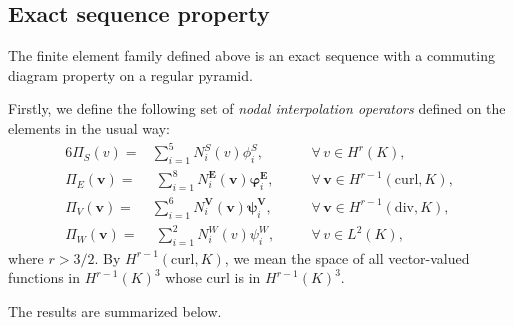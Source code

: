 \documentclass[twoside,reqno,final]{amsart}
\renewcommand{\b}[1]{{\boldsymbol{#1}}}
\begin{document}
\subsection{Exact sequence property}
The finite element family defined above is an exact sequence with a commuting diagram property on a regular pyramid.

Firstly, we define the following set of {\em nodal interpolation operators} defined
on the elements in the usual way:
\begin{alignat*}{6}
 \varPi_S(v) = & \sum_{i=1}^5 N_i^S(v)\phi_i^S, && \quad\forall\, v\in H^{r}(K),\\
\b\varPi_E(\b v) = &\; \sum_{i=1}^8 N_i^{\b E}(\b v)\b\varphi_i^{\b E},&& \quad\forall\,\b v\in H^{r-1}(\mathrm{curl},K),\\
\b \varPi_V(\b v) = & \sum_{i=1}^6 N_i^{\b V}(\b v)\b\psi_i^{\b V},&& \quad\forall\, \b v\in H^{r-1}(\mathrm{div},K),\\
 \varPi_W(\b v) = &\; \sum_{i=1}^2 N_i^W(v)\psi_i^W,&& \quad\forall\, v\in L^2(K),
 \end{alignat*}
 where $r>3/2$. By $H^{r-1}(\mathrm{curl}, K)$, we mean the space of all vector-valued functions in $H^{r-1}(K)^3$ whose curl is in
$H^{r-1}(K)^3$. 


The results are summarized below.
\end{document}
